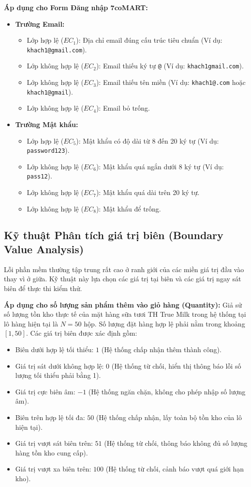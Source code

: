 \noindent\textbf{Áp dụng cho Form Đăng nhập 7coMART:}
\begin{itemize}
    \item \textbf{Trường Email:}
    \begin{itemize}
        \item Lớp hợp lệ ($EC_1$): Địa chỉ email đúng cấu trúc tiêu chuẩn (Ví dụ: \texttt{khach1@gmail.com}).
        \item Lớp không hợp lệ ($EC_2$): Email thiếu ký tự \texttt{@} (Ví dụ: \texttt{khach1gmail.com}).
        \item Lớp không hợp lệ ($EC_3$): Email thiếu tên miền (Ví dụ: \texttt{khach1@.com} hoặc \texttt{khach1@gmail}).
        \item Lớp không hợp lệ ($EC_4$): Email bỏ trống.
    \end{itemize}
    \item \textbf{Trường Mật khẩu:}
    \begin{itemize}
        \item Lớp hợp lệ ($EC_5$): Mật khẩu có độ dài từ 8 đến 20 ký tự (Ví dụ: \texttt{password123}).
        \item Lớp không hợp lệ ($EC_6$): Mật khẩu quá ngắn dưới 8 ký tự (Ví dụ: \texttt{pass12}).
        \item Lớp không hợp lệ ($EC_7$): Mật khẩu quá dài trên 20 ký tự.
        \item Lớp không hợp lệ ($EC_8$): Mật khẩu để trống.
    \end{itemize}
\end{itemize}

\subsection{Kỹ thuật Phân tích giá trị biên (Boundary Value Analysis)}
Lỗi phần mềm thường tập trung rất cao ở ranh giới của các miền giá trị đầu vào thay vì ở giữa. Kỹ thuật này lựa chọn các giá trị tại biên và các giá trị ngay sát biên để thực thi kiểm thử.

\noindent\textbf{Áp dụng cho số lượng sản phẩm thêm vào giỏ hàng (Quantity):}
Giả sử số lượng tồn kho thực tế của mặt hàng sữa tươi TH True Milk trong hệ thống tại lô hàng hiện tại là $N = 50$ hộp. Số lượng đặt hàng hợp lệ phải nằm trong khoảng $[1, 50]$. Các giá trị biên được xác định gồm:
\begin{itemize}
    \item Biên dưới hợp lệ tối thiểu: $1$ (Hệ thống chấp nhận thêm thành công).
    \item Giá trị sát dưới không hợp lệ: $0$ (Hệ thống từ chối, hiển thị thông báo lỗi số lượng tối thiểu phải bằng 1).
    \item Giá trị cực biên âm: $-1$ (Hệ thống ngăn chặn, không cho phép nhập số lượng âm).
    \item Biên trên hợp lệ tối đa: $50$ (Hệ thống chấp nhận, lấy toàn bộ tồn kho của lô hiện tại).
    \item Giá trị vượt sát biên trên: $51$ (Hệ thống từ chối, thông báo không đủ số lượng hàng tồn kho cung cấp).
    \item Giá trị vượt xa biên trên: $100$ (Hệ thống từ chối, cảnh báo vượt quá giới hạn kho).
\end{itemize}

